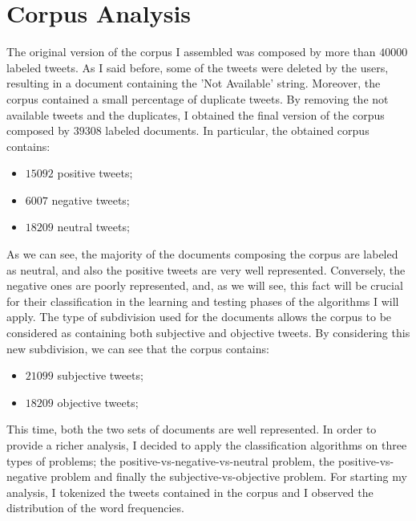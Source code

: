 \documentclass[11pt,twocolumn]{article}
\begin{document}
    \section{Corpus Analysis} %
    \label{sec:corpus_analysis}
        The original version of the corpus I assembled was composed by more than $40000$ labeled tweets.
        As I said before, some of the tweets were deleted by the users, resulting in a document
        containing the 'Not Available' string. Moreover, the corpus contained a small percentage of
        duplicate tweets. By removing the not available tweets and the duplicates, I obtained the final
        version of the corpus composed by $39308$ labeled documents. In particular, the obtained corpus
        contains:

        \begin{itemize}
            \item $15092$ positive tweets;
            \item $6007$ negative tweets;
            \item $18209$ neutral tweets;
        \end{itemize}

        \noindent
        As we can see, the majority of the documents composing the corpus are labeled as neutral, and also
        the positive tweets are very well represented. Conversely, the negative ones are poorly
        represented, and, as we will see, this fact will be crucial for their classification in the
        learning and testing phases of the algorithms I will apply. The type of subdivision used for the
        documents allows the corpus to be considered as containing both subjective and objective tweets.
        By considering this new subdivision, we can see that the corpus contains:

        \begin{itemize}
            \item $21099$ subjective tweets;
            \item $18209$ objective tweets;
        \end{itemize}

        \noindent
        This time, both the two sets of documents are well represented. In order to provide a richer
        analysis, I decided to apply the classification algorithms on three types of problems; the
        positive-vs-negative-vs-neutral problem, the positive-vs-negative problem and finally the
        subjective-vs-objective problem. For starting my analysis, I tokenized the tweets contained in the
        corpus and I observed the distribution of the word frequencies.
\end{document}
